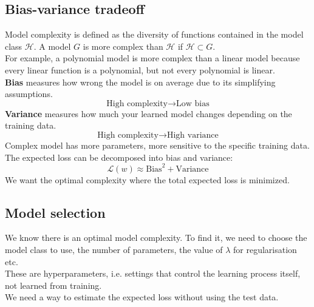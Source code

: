 \documentclass[../Probability.tex]{subfiles}
\begin{document}
\subsection{Bias-variance tradeoff}
Model complexity is defined as the diversity of functions contained in the model class $\mathcal{H}$.
A model $G$ is more complex than $\mathcal{H}$ if $\mathcal{H} \subset G$.\\
For example,  a polynomial model is more complex than a linear model because every linear function is a polynomial, but not every polynomial is linear.\\
\textbf{Bias} measures how wrong the model is on average due to its simplifying assumptions.
$$\text{High complexity} \rightarrow \text{Low bias}$$
\textbf{Variance} measures how much your learned model changes depending on the training data.
$$\text{High complexity} \rightarrow \text{High variance}$$
Complex model has more parameters, more sensitive to the specific training data.\\
The expected loss can be decomposed into bias and variance:
$$\mathcal{L}(w) \approx \text{Bias}^2 + \text{Variance}$$
We want the optimal complexity where the total expected loss is minimized.

\subsection{Model selection}
We know there is an optimal model complexity. To find it, we need to choose the model class to use, the number of parameters, the value of $\lambda$ for regularisation etc.\\
These are hyperparameters, i.e. settings that control the learning process itself, not learned from training.\\
We need a way to estimate the expected loss without using the test data.\\
\end{document}
